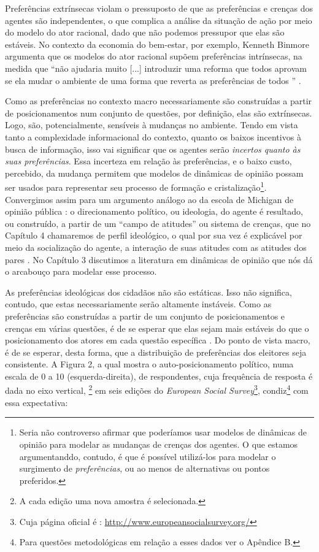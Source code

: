 Preferências extrínsecas violam o pressuposto de que as preferências e crenças
dos agentes são independentes, o que complica a análise da situação de ação por
meio do modelo do ator racional, dado que não podemos pressupor que elas são
estáveis. No contexto da economia do bem-estar, por exemplo,
Kenneth Binmore argumenta que os modelos do ator racional supõem
preferências intrínsecas, na medida que ``não ajudaria muito [...] introduzir uma
reforma que todos aprovam se ela mudar o ambiente de uma forma que reverta as
preferências de todos '' \cite[p.6]{binmore2008rational}.

Como as preferências no contexto macro necessariamente são construídas a partir
de posicionamentos num conjunto de questões, por definição, elas são
extrínsecas. Logo, são, potencialmente, sensíveis à mudanças no ambiente. Tendo
em vista tanto a complexidade informacional do contexto, quanto os baixos
incentivos à busca de informação, isso vai significar que os agentes serão
\textit{incertos quanto às suas preferências}. Essa incerteza em relação às
preferências, e o baixo custo, percebido, da mudança permitem que modelos de
dinâmicas de opinião possam ser usados para representar seu processo de formação
e cristalização\footnote{Seria não controverso afirmar que poderíamos usar
  modelos de dinâmicas de opinião para modelar as mudanças de crenças dos
  agentes. O que estamos argumentanddo, contudo, é que é  possível utilizá-los para
  modelar o surgimento de \textit{preferências}, ou ao menos de alternativas ou
  pontos preferidos.}. Convergimos assim para um argumento análogo ao da escola
de Michigan de opinião pública : o direcionamento político, ou ideologia, do
agente é resultado, ou construído, a partir de um ``campo de atitudes'' ou
sistema de crenças, que no Capítulo 4 chamaremos de perfil ideológico, o qual
por sua vez é explicável por meio da socialização do agente, a interação de suas
atitudes com as atitudes dos pares \cite{figueiredo2008decisao}. No Capítulo 3
discutimos a literatura em dinâmicas de opinião que nós dá o arcabouço para
modelar esse processo.

As preferências ideológicas dos cidadãos não são estáticas. Isso não significa,
contudo, que estas necessariamente serão altamente instáveis. Como as
preferências são construídas a partir de um conjunto de posicionamentos e
crenças em várias questões, é de se esperar que elas sejam mais estáveis do que
o posicionamento dos atores em cada questão específica
\cite{druckman2012public}. Do ponto de vista macro, é de se esperar, desta
forma, que a distribuição de preferências dos eleitores seja consistente. A
Figura 2, a qual mostra o auto-posicionamento político, numa escala de 0 a 10
(esquerda-direita), de respondentes, cuja frequência de resposta é dada no eixo
vertical, \footnote{A cada edição uma nova amostra é selecionada.} em seis
edições do \textit{European Social Survey}\footnote{Cuja página oficial é :
  \url{http://www.europeansocialsurvey.org/}}, condiz\footnote{Para questões
  metodológicas em relação a esses dados ver o Apêndice B.} com essa
expectativa:

